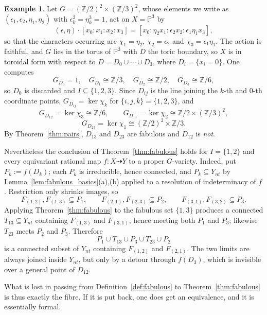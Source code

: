 \documentclass[11pt]{amsart}
\theoremstyle{plain}
\theoremstyle{definition}
\newtheorem{example}[theorem]{Example}
\theoremstyle{remark}
\numberwithin{equation}{section}
\begin{document}
\begin{example} \label{ex:no_converse}
Let $G = (\mathbb{Z}/2)^2 \times (\mathbb{Z}/3)^2$, whose elements we write
as $(\epsilon_1,\epsilon_2,\eta_1,\eta_2)$ with $\epsilon_k^2 =
\eta_k^3 = 1$, act on $X = \mathbb{P}^3$ by
\[
(\epsilon,\eta) \cdot [x_0 : x_1 : x_2 : x_3]
= [x_0 : \eta_2 x_1 : \epsilon_2 x_2 : \epsilon_1\eta_1 x_3] ,
\]
so that the characters occurring are $\chi_1 = \eta_2$, $\chi_2 =
\epsilon_2$ and $\chi_3 = \epsilon_1\eta_1$.  The action is faithful, and
$G$ lies in the torus of $\mathbb{P}^3$ with $D$ the toric boundary, so $X$
is in toroidal form with respect to $D = D_0 \cup \cdots \cup D_3$, where
$D_i = \{x_i = 0\}$.  One computes
\[
G_{D_0} = 1 , \quad
G_{D_1} \cong \mathbb{Z}/3 , \quad
G_{D_2} \cong \mathbb{Z}/2 , \quad
G_{D_3} \cong \mathbb{Z}/6 ,
\]
so $D_0$ is discarded and $I \subseteq \{1,2,3\}$.  Since $D_{ij}$ is the
line joining the $k$-th and $0$-th coordinate points, $G_{D_{ij}} =
\ker\chi_k$ for $\{i,j,k\} = \{1,2,3\}$, and
\[
G_{D_{12}} = \ker\chi_3 \cong \mathbb{Z}/6 , \qquad
G_{D_{13}} = \ker\chi_2 \cong \mathbb{Z}/2 \times (\mathbb{Z}/3)^2 ,
\]
\[
G_{D_{23}} = \ker\chi_1 \cong (\mathbb{Z}/2)^2 \times \mathbb{Z}/3 .
\]
By Theorem~\ref{thm:pairs}, $D_{13}$ and $D_{23}$ are fabulous and
$D_{12}$ is \emph{not}.

Nevertheless the conclusion of Theorem~\ref{thm:fabulous} holds for
$I = \{1,2\}$ and every equivariant rational map $f : X \dasharrow Y$ to a
proper $G$-variety.  Indeed, put $P_k := \overline{f(D_k)}$; each $P_k$ is
irreducible, hence connected, and $P_k \subseteq Y_{nt}$ by
Lemma~\ref{lem:fabulous_basics}(a),(b) applied to a resolution of
indeterminacy of $f$.  Restriction only shrinks images, so
\[
F_{(1,2)}, F_{(1,3)} \subseteq P_1 , \qquad
F_{(2,1)}, F_{(2,3)} \subseteq P_2 , \qquad
F_{(3,1)}, F_{(3,2)} \subseteq P_3 .
\]
Applying Theorem~\ref{thm:fabulous} to the fabulous set $\{1,3\}$ produces
a connected $T_{13} \subseteq Y_{nt}$ containing $F_{(1,3)}$ and
$F_{(3,1)}$, hence meeting both $P_1$ and $P_3$; likewise $T_{23}$ meets
$P_2$ and $P_3$.  Therefore
\[
P_1 \cup T_{13} \cup P_3 \cup T_{23} \cup P_2
\]
is a connected subset of $Y_{nt}$ containing $F_{(1,2)}$ and $F_{(2,1)}$.
The two limits are always joined inside $Y_{nt}$, but only by a detour
through $f(D_3)$, which is invisible over a general point of $D_{12}$.
\end{example}

What is lost in passing from Definition~\ref{def:fabulous} to
Theorem~\ref{thm:fabulous} is thus exactly the fibre.  If it is put back,
one does get an equivalence, and it is essentially formal.
\end{document}
